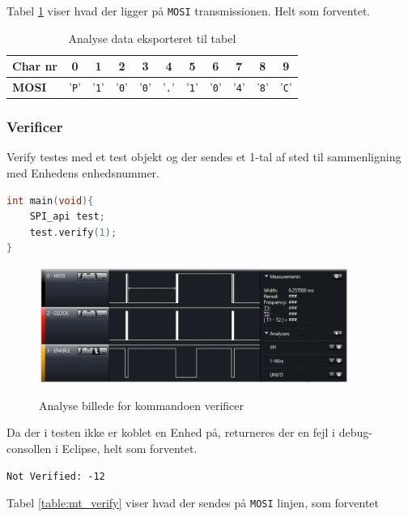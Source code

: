 Tabel \ref{table:mt_config} viser hvad der ligger på \verb+MOSI+ transmissionen. Helt som forventet.

\begin{table}[H]
	\caption{Analyse data eksporteret til tabel}
	\centering
	\begin{tabular}{|l|c|c|c|c|c|c|c|c|c|c|}
		\hline 
		\textbf{Char nr} & \textbf{0} & \textbf{1} & \textbf{2} & \textbf{3} & \textbf{4} & \textbf{5} 
						 & \textbf{6} & \textbf{7} & \textbf{8} & \textbf{9}\\ 		
		\hline 
		\textbf{MOSI} & '\verb+P+' & '\verb+1+' & '\verb+0+' & '\verb+0+' & '\verb+.+' & '\verb+1+' 
						& '\verb+0+' & '\verb+4+' & '\verb+8+' & '\verb+C+' \\ 
		\hline 
	\end{tabular} 
	\label{table:mt_config}
\end{table}


\subsubsection*{Verificer}
Verify testes med et test objekt og der sendes et 1-tal af sted til sammenligning med Enhedens enhedsnummer.

\begin{lstlisting}[language=C]
int main(void){
	SPI_api test;	
	test.verify(1);
}
\end{lstlisting}

\begin{figure}[H]
\centering
{\includegraphics[width=0.90\textwidth]{filer/modultest/Billeder/mt_verify}}
\caption{Analyse billede for kommandoen verificer}
\label{lab:mt_verify}
\end{figure}

Da der i testen ikke er koblet en Enhed på, returneres der en fejl i debug-consollen i Eclipse, helt som forventet.

\verb+Not Verified: -12+

Tabel \ref{table:mt_verify} viser hvad der sendes på \verb+MOSI+ linjen, som forventet

